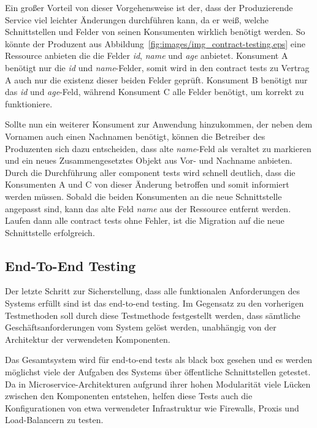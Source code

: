 \documentclass[12pt,a4paper,bibliography=totocnumbered,listof=totocnumbered]{scrartcl}
\begin{document}

Ein großer Vorteil von dieser Vorgehensweise ist der, dass der Produzierende Service viel leichter Änderungen durchführen kann, da er weiß, welche Schnittstellen und Felder von seinen Konsumenten wirklich benötigt werden. So könnte der Produzent aus Abbildung~\ref{fig:images/img_contract-testing.eps} eine Ressource anbieten die die Felder \textit{id}, \textit{name} und \textit{age} anbietet. Konsument A benötigt nur die \textit{id} und \textit{name}-Felder, somit wird in den contract tests zu Vertrag A auch nur die existenz dieser beiden Felder geprüft. Konsument B benötigt nur das \textit{id} und \textit{age}-Feld, während Konsument C alle Felder benötigt, um korrekt zu funktioniere.\cite{clemson}

Sollte nun ein weiterer Konsument zur Anwendung hinzukommen, der neben dem Vornamen auch einen Nachnamen benötigt, können die Betreiber des Produzenten sich dazu entscheiden, dass alte \textit{name}-Feld als veraltet zu markieren und ein neues Zusammengesetztes Objekt aus Vor- und Nachname anbieten. Durch die Durchführung aller component tests wird schnell deutlich, dass die Konsumenten A und C von dieser Änderung betroffen und somit informiert werden müssen. Sobald die beiden Konsumenten an die neue Schnittstelle angepasst sind, kann das alte Feld \textit{name} aus der Ressource entfernt werden. Laufen dann alle contract tests ohne Fehler, ist die Migration auf die neue Schnittstelle erfolgreich.\cite{clemson}

\subsection{End-To-End Testing}

Der letzte Schritt zur Sicherstellung, dass alle funktionalen Anforderungen des Systems erfüllt sind ist das end-to-end testing. Im Gegensatz zu den vorherigen Testmethoden soll durch diese Testmethode festgestellt werden, dass sämtliche Geschäftsanforderungen vom System gelöst werden, unabhängig von der Architektur der verwendeten Komponenten.~\cite{clemson}

Das Gesamtsystem wird für end-to-end tests als black box gesehen und es werden möglichst viele der Aufgaben des Systems über öffentliche Schnittstellen getestet. Da in Microservice-Architekturen aufgrund ihrer hohen Modularität viele Lücken zwischen den Komponenten entstehen, helfen diese Tests auch die Konfigurationen von etwa verwendeter Infrastruktur wie Firewalls, Proxis und Load-Balancern zu testen.\cite{clemson}
\end{document}
